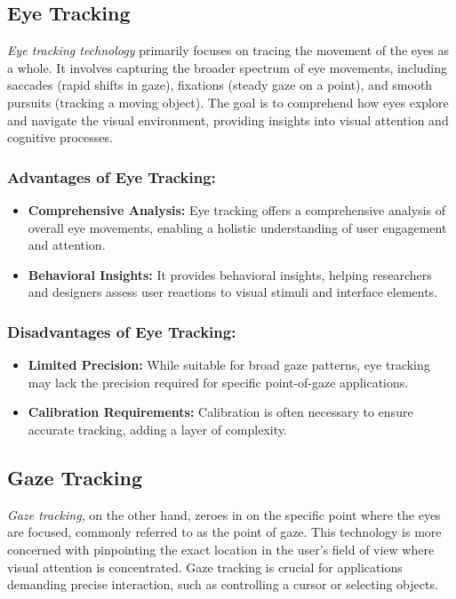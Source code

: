 \documentclass[letterpaper, 10 pt, conference]{ieeeconf}  %
\begin{document}
\subsection{Eye Tracking}

\textit{Eye tracking technology} primarily focuses on tracing the movement of the eyes as a whole. It involves capturing the broader spectrum of eye movements, including saccades (rapid shifts in gaze), fixations (steady gaze on a point), and smooth pursuits (tracking a moving object). The goal is to comprehend how eyes explore and navigate the visual environment, providing insights into visual attention and cognitive processes.

\subsubsection{Advantages of Eye Tracking:}
\begin{itemize}
    \item \textbf{Comprehensive Analysis:} Eye tracking offers a comprehensive analysis of overall eye movements, enabling a holistic understanding of user engagement and attention.
    
    \item \textbf{Behavioral Insights:} It provides behavioral insights, helping researchers and designers assess user reactions to visual stimuli and interface elements.
\end{itemize}

\subsubsection{Disadvantages of Eye Tracking:}
\begin{itemize}
    \item \textbf{Limited Precision:} While suitable for broad gaze patterns, eye tracking may lack the precision required for specific point-of-gaze applications.
    
    \item \textbf{Calibration Requirements:} Calibration is often necessary to ensure accurate tracking, adding a layer of complexity.
\end{itemize}

\subsection{Gaze Tracking}

\textit{Gaze tracking}, on the other hand, zeroes in on the specific point where the eyes are focused, commonly referred to as the point of gaze. This technology is more concerned with pinpointing the exact location in the user's field of view where visual attention is concentrated. Gaze tracking is crucial for applications demanding precise interaction, such as controlling a cursor or selecting objects.
\end{document}
